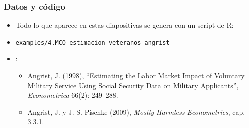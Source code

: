 \documentclass[t, compress, spanish, aspectratio=169]{beamer}
\newcommand{\term}[1]{\structure{\textbf{#1}}} %
\begin{document}
	\begin{frame}
		\frametitle{Datos y c\'odigo}
		\small
		\begin{itemize}
			\item Todo lo que aparece en estas diapositivas se genera con un script de R:
			\item [] \texttt{examples/4.MCO\_estimacion\_veteranos-angrist}
			\item \term{Fuente}:
			\begin{itemize}
				\item Angrist, J. (1998), ``Estimating the Labor Market Impact of Voluntary Military Service Using Social Security Data on Military Applicants'', \emph{Econometrica} 66(2): 249--288.
				\item Angrist, J. y J.-S. Pischke (2009), \emph{Mostly Harmless Econometrics}, cap. 3.3.1.
			\end{itemize}
		\end{itemize}
	\end{frame}
\end{document}
